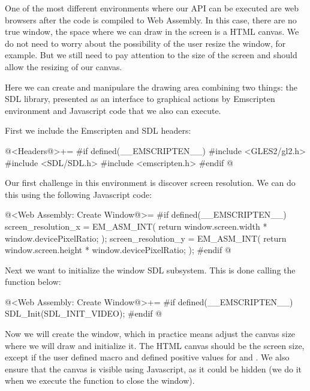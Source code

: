 
One of the most different environments where our API can be executed
are web browsers after the code is compiled to Web Assembly. In this
case, there are no true window, the space where we can draw in the
screen is a HTML canvas. We do not need to worry about the possibility
of the user resize the window, for example. But we still need to pay
attention to the size of the screen and should allow the resizing of
our canvas.

Here we can create and manipulare the drawing area combining two
things: the SDL library, presented as an interface to graphical
actions by Emscripten environment and Javascript code that we also can
execute.

First we include the Emscripten and SDL headers:

\iniciocodigo
@<Headers@>+=
#if defined(__EMSCRIPTEN__)
#include <GLES2/gl2.h>
#include <SDL/SDL.h>
#include <emscripten.h>
#endif
@
\fimcodigo


Our first challenge in this environment is discover screen
resolution. We can do this using the following Javascript code:

\iniciocodigo
@<Web Assembly: Create Window@>=
#if defined(__EMSCRIPTEN__)
screen_resolution_x = EM_ASM_INT({
  return window.screen.width * window.devicePixelRatio;
});
screen_resolution_y = EM_ASM_INT({
  return window.screen.height * window.devicePixelRatio;
});
#endif
@
\fimcodigo

Next we want to initialize the window SDL subsystem. This is done
calling the function below:

\iniciocodigo
@<Web Assembly: Create Window@>+=
#if defined(__EMSCRIPTEN__)
SDL_Init(SDL_INIT_VIDEO);
#endif
@
\fimcodigo

Now we will create the window, which in practice means adjust the
canvas size where we will draw and initialize it. The HTML canvas
should be the screen size, except if the user defined
macro  and defined positive
values for 
and . We also ensure that the
canvas is visible using Javascript, as it could be hidden (we do it
when we execute the function to close the window).

